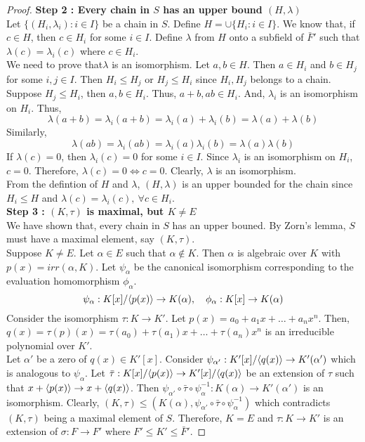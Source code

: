 \begin{proof}
	\textbf{Step 2 : Every chain in $S$ has an upper bound $(H,\lambda)$}\\
	Let $\{ (H_i,\lambda_i) : i \in I \}$ be a chain in $S$.
	Define $\displaystyle H = \cup \{H_i : i \in I\}$.
	We know that, if $c \in H$, then $c \in H_i$ for some $i \in I$.
	Define $\lambda$ from $H$ onto a subfield of $\bar{F}'$ such that $\lambda(c) = \lambda_i(c)$ where $ c \in H_i$.\\

	We need to prove that$\lambda$ is an isomorphism.
	Let $a,b \in H$.
	Then $a \in H_i$ and $b \in H_j$ for some $i,j \in I$.
	Then $H_i \le H_j$ or $H_j \le H_i$ since $H_i,H_j$ belongs to a chain.
	Suppose $H_j \le H_i$, then $a,b \in H_i$.
	Thus, $a+b,ab \in H_i$.
	And, $\lambda_i$ is an isomorphism on $H_i$.
	Thus,
	\[ \lambda(a+b) = \lambda_i(a + b) = \lambda_i(a) + \lambda_i(b) = \lambda(a) + \lambda(b) \]
	Similarly,
	\[ \lambda(ab) = \lambda_i(ab) = \lambda_i(a)\lambda_i(b) = \lambda(a)\lambda(b) \]
	If $\lambda(c) = 0$, then $\lambda_i(c) = 0$ for some $i \in I$.
	Since $\lambda_i$ is an isomorphism on $H_i$, $c = 0$.
	Therefore, $\lambda(c) = 0 \iff c = 0$.
	Clearly, $\lambda$ is an isomorphism.\\

	From the defintion of $H$ and $\lambda$, $(H,\lambda)$ is an upper bounded for the chain since $H_i \le H$ and $\lambda(c) = \lambda_i(c),\ \forall c \in H_i$.\\

	\textbf{Step 3 : $(K,\tau)$ is maximal, but $K \ne E$}\\
	We have shown that, every chain in $S$ has an upper bouned.
	By Zorn's lemma, $S$ must have a maximal element, say $(K,\tau)$.\\

	Suppose $K \ne E$.
	Let $\alpha \in E$ such that $\alpha \notin K$.
	Then $\alpha$ is algebraic over $K$ with $p(x) = irr(\alpha,K)$.
	Let $\psi_\alpha$ be the canonical isomorphism corresponding to the evaluation homomorphism $\phi_\alpha$.
	\[ \psi_\alpha : K[x]/\langle p(x)\rangle \to K(\alpha),\quad \phi_\alpha : K[x] \to K(\alpha) \]
	Consider the isomorphism $\tau : K \to K'$.
	Let $p(x) = a_0 + a_1 x + \dots + a_nx^n$.
	Then, $q(x) = \tau(p)(x) = \tau(a_0) + \tau(a_1) x + \dots + \tau(a_n)x^n$ is an irreducible polynomial over $K'$.\\

	Let $\alpha'$ be a zero of $q(x) \in K'[x]$.
	Consider $\psi_{\alpha'} : K'[x]/\langle q(x)\rangle \to K'(\alpha')$ which is analogous to $\psi_\alpha$.
	Let $\bar{\tau} : K[x]/\langle p(x)\rangle \to K'[x]/\langle q(x)\rangle$ be an extension of $\tau$ such that $x+\langle p(x)\rangle \to x+\langle q(x)\rangle$.
	Then $\psi_{\alpha'} \circ \bar{\tau} \circ \psi_\alpha^{-1} : K(\alpha) \to K'(\alpha')$ is an isomorphism.
	Clearly, $(K,\tau) \leq \left(K(\alpha),\psi_{\alpha'} \circ \bar{\tau} \circ \psi_{\alpha}^{-1}\right)$ which contradicts $(K,\tau)$ being a maximal element of $S$.
	Therefore, $K = E$ and $\tau : K \to K'$ is an extension of $\sigma : F \to F'$ where $F' \le K' \le \bar{F}'$.
\end{proof}

